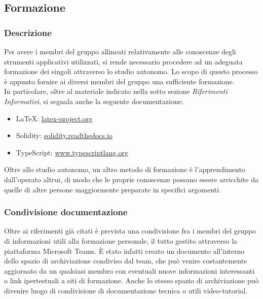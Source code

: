 \subsection{Formazione}
		\subsubsection{Descrizione}	
		Per avere i membri del gruppo \Gruppo{} allineati relativamente alle conoscenze degli strumenti applicativi utilizzati, si rende necessario procedere ad un adeguata formazione dei singoli attraverso lo studio autonomo. Lo scopo di questo processo è appunto fornire ai diversi membri del gruppo una sufficiente formazione.\\
		In particolare, oltre al materiale indicato nella sotto sezione \textit{Riferimenti Informativi}, si segnala anche la seguente documentazione:
		\begin{itemize}
			\item \LaTeX{}: \href{latex-project.org}{latex-project.org}
			\item Solidity: \href{solidity.readthedocs.io}{solidity.readthedocs.io}
			\item TypeScript: \href{www.typescriptlang.org}{www.typescriptlang.org}
		\end{itemize}
		Oltre allo studio autonomo, un altro metodo di formazione è l'apprendimento dall'operato altrui, di modo che le proprie conoscenze possano essere arricchite da quelle di altre persone maggiormente preparate in specifici argomenti.
		
		\subsubsection{Condivisione documentazione}
		Oltre ai riferimenti già citati è prevista una condivisione fra i membri del gruppo di informazioni utili alla formazione personale, il tutto gestito attraverso la piattaforma Microsoft Teams. È stato infatti creato un documento all'interno dello spazio di archiviazione condiviso dal team, che può venire costantemente aggiornato da un qualsiasi membro con eventuali nuove informazioni interessanti o link ipertestuali a siti di formazione. Anche lo stesso spazio di archiviazione può divenire luogo di condivisione di documentazione tecnica o utili video-tutorial.
